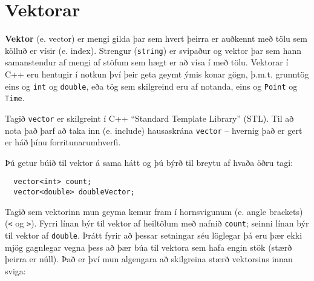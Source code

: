 





\chapter{Vektorar}
\label{vectors}

{\bf Vektor} (e. vector) er mengi gilda þar sem hvert þeirra er auðkennt með tölu sem kölluð er vísir (e. index).
Strengur ({\tt string}) er svipaður og vektor þar sem hann samanstendur af mengi af stöfum sem hægt er að vísa í með tölu.
Vektorar í C++ eru hentugir í notkun því þeir geta geymt ýmis konar gögn, þ.m.t. grunntög eins og {\tt int} og {\tt double}, 
eða tög sem skilgreind eru af notanda, eins og {\tt Point} og {\tt Time}.

Tagið {\tt vector} er skilgreint í C++ ``Standard Template Library'' (STL).
Til að nota það þarf að taka inn (e. include) hausaskrána {\tt vector} -- hvernig það er gert er háð þínu forritunarumhverfi.

Þú getur búið til vektor á sama hátt og þú býrð til breytu af hvaða öðru tagi:

\begin{verbatim}
  vector<int> count;
  vector<double> doubleVector;
\end{verbatim}
%
Tagið sem vektorinn mun geyma kemur fram í hornsvigunum (e. angle brackets) ({\tt <} og {\tt >}).
Fyrri línan býr til vektor af heiltölum með nafnið {\tt count}; seinni línan býr til vektor af {\tt double}.
Þrátt fyrir að þessar setningar séu löglegar þá eru þær ekki mjög gagnlegar vegna þess að þær búa til vektora sem hafa engin stök (stærð þeirra er núll).
Það er því mun algengara að skilgreina stærð vektorsins innan sviga: 

